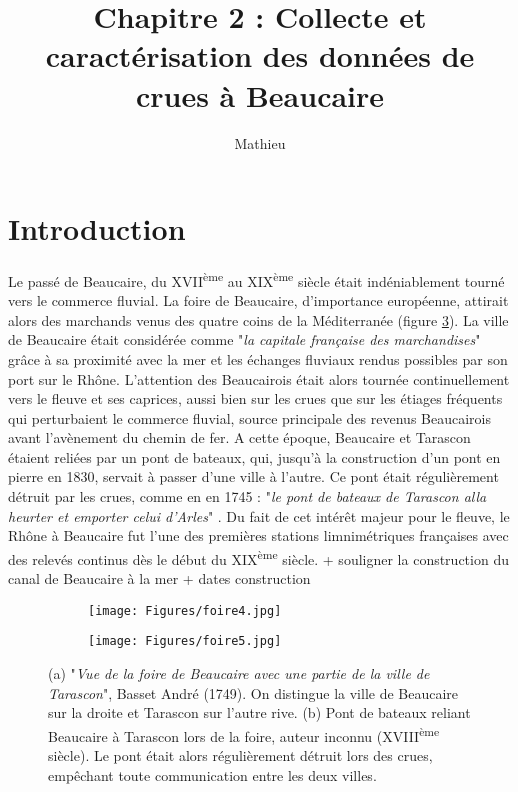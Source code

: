 \documentclass[11pt]{article}
\title{Chapitre 2 : Collecte et caractérisation des données de crues à Beaucaire}
\author{Mathieu}
\begin{document}
\maketitle


\tableofcontents

\section{Introduction}

\paragraph{} Le passé de Beaucaire, du XVII\textsuperscript{ème} au XIX\textsuperscript{ème} siècle était indéniablement tourné vers le commerce fluvial. La foire de Beaucaire, d'importance européenne, attirait alors des marchands venus des quatre coins de la Méditerranée (figure \ref{fig:foire}). La ville de Beaucaire était considérée comme "\textit{la capitale française des marchandises}" \citep{leon_vie_1953} grâce à sa proximité avec la mer et les échanges fluviaux rendus possibles par son port sur le Rhône. L'attention des Beaucairois était alors tournée continuellement vers le fleuve et ses caprices, aussi bien sur les crues que sur les étiages fréquents qui perturbaient le commerce fluvial, source principale des revenus Beaucairois avant l'avènement du chemin de fer. A cette époque, Beaucaire et Tarascon étaient reliées par un pont de bateaux, qui, jusqu'à la construction d'un pont en pierre en 1830, servait à passer d'une ville à l'autre. Ce pont était régulièrement détruit par les crues, comme en en 1745 : "\textit{le pont de bateaux de Tarascon alla heurter et emporter celui d'Arles}" \citep{anibert_annales_1764}. Du fait de cet intérêt majeur pour le fleuve, le Rhône à Beaucaire fut l'une des premières stations limnimétriques françaises avec des relevés continus dès le début du XIX\textsuperscript{ème} siècle. + souligner la construction du canal de Beaucaire à la mer + dates construction

\begin{figure}[h]
		\centering
            \begin{subfigure}{0.49\linewidth}
            \centering
            	\texttt{[image: Figures/foire4.jpg]}\hfill
            	\caption{}
            	\label{subfig:foire1}
            \end{subfigure}
            \begin{subfigure}{0.49\linewidth}
            \centering
            	\texttt{[image: Figures/foire5.jpg]}
            	\caption{}
           		\label{subfig:foire2}
            \end{subfigure}
\caption{(a) "\textit{Vue de la foire de Beaucaire avec une partie de la ville de Tarascon}", Basset André (1749). On distingue la ville de Beaucaire sur la droite et Tarascon sur l'autre rive. 
(b) Pont de bateaux reliant Beaucaire à Tarascon lors de la foire, auteur inconnu (XVIII\textsuperscript{ème} siècle). Le pont était alors régulièrement détruit lors des crues, empêchant toute communication entre les deux villes.}
\label{fig:foire}
\end{figure}
\end{document}
